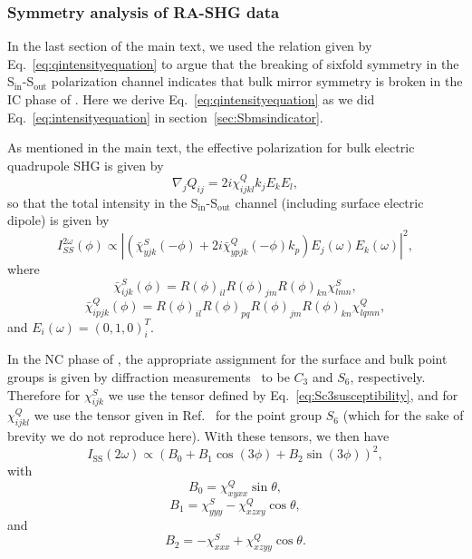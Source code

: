 \subsubsection{Symmetry analysis of RA-SHG data} \label{sec:sstwofold}

In the last section of the main text, we used the relation given by Eq.~\ref{eq:qintensityequation} to argue that the breaking of sixfold symmetry in the S$_\mathrm{in}$-S$_\mathrm{out}$ polarization channel indicates that bulk mirror symmetry is broken in the IC phase of \tastwo.
Here we derive Eq.~\ref{eq:qintensityequation} as we did Eq.~\ref{eq:intensityequation} in section~\ref{sec:Sbmsindicator}.

As mentioned in the main text, the effective polarization for bulk electric quadrupole SHG is given by~\cite{kumar_magnetic_2017, shen}
\begin{equation}
\nabla_j Q_{ij} = 2i\chi_{ijkl}^Qk_j E_k E_l,
\end{equation}
so that the total intensity in the S$_\mathrm{in}$-S$_\mathrm{out}$ channel (including surface electric dipole) is given by
\begin{equation}
\label{eq:SQintensity}
I_{SS}^{2\omega}(\phi) \propto \left|\left(\bar{\chi}^S_{yjk}(-\phi)+2i \bar{\chi}_{ypjk}^Q(-\phi)k_p\right)E_j(\omega)E_k(\omega)\right|^2,
\end{equation}
where
\begin{equation}
\bar{\chi}^S_{ijk}(\phi) = R(\phi)_{il}R(\phi)_{jm}R(\phi)_{kn}\chi^S_{lmn},
\end{equation}
\begin{equation}
\bar{\chi}^Q_{ipjk}(\phi) = R(\phi)_{il}R(\phi)_{pq}R(\phi)_{jm}R(\phi)_{kn}\chi_{lqmn}^Q,
\end{equation}
and $E_i(\omega) = (0, 1, 0)^T_i$.

In the NC phase of \tastwo, the appropriate assignment for the surface and bulk point groups is given by diffraction measurements~\cite{spijkerman_x-ray_1997} to be $C_3$ and $S_6$, respectively.
Therefore for $\chi^S_{ijk}$ we use the tensor defined by Eq.~\ref{eq:Sc3susceptibility}, and for $\chi^Q_{ijkl}$ we use the tensor given in Ref.~ for the point group $S_6$ (which for the sake of brevity we do not reproduce here).
With these tensors, we then have
\begin{equation}
\label{eq:Sequationwithbs}
I_\mathrm{SS}(2\omega) \propto (B_0+B_1\cos{(3\phi)}+B_2\sin{(3\phi)})^2,
\end{equation}
with
\begin{equation}
B_0 = \chi^Q_{xyxx}\sin{\theta},
\end{equation}
\begin{equation}
B_1 = \chi^S_{yyy} -\chi^Q_{xzxy}\cos{\theta},
\end{equation}
and
\begin{equation}
B_2 = -\chi^S_{xxx}+\chi^Q_{xzyy}\cos{\theta}.
\end{equation}

